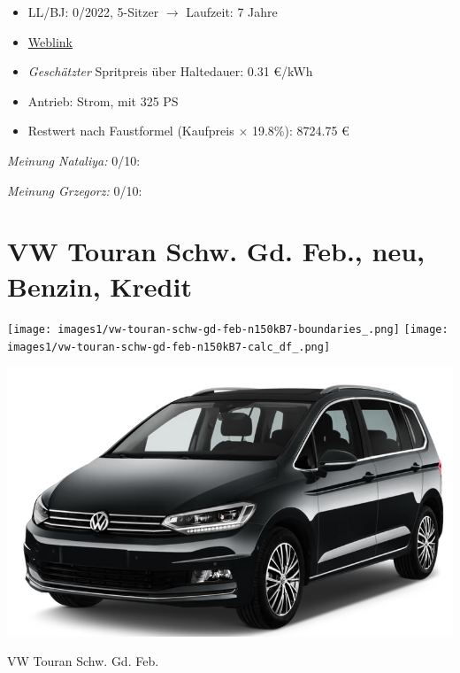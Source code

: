 \documentclass[landscape, DIV=99, 14pt]{scrartcl}
\begin{document}
\begin{itemize}
    \item LL/BJ: 0/2022, 5-Sitzer $\rightarrow$ Laufzeit: 7 Jahre
    \item \href{https://www.tesla.com/de_de/model3/design\#overview}{Weblink}
    \item \emph{Gesch\"atzter} Spritpreis \"uber Haltedauer: 0.31 \euro{}/kWh
    \item Antrieb: Strom, mit 325 PS
    \item Restwert nach Faustformel (Kaufpreis $\times$ 19.8\%): 8724.75 \euro{}
\end{itemize}

\begin{small}
\emph{Meinung Nataliya:} 0/10: 
        
\emph{Meinung Grzegorz:} 0/10: 
\end{small}

\pagebreak


\twocolumn

\section*{VW Touran Schw. Gd. Feb., neu, Benzin, Kredit}
\begin{center}
\texttt{[image: images1/vw-touran-schw-gd-feb-n150kB7-boundaries\_.png]}
\null
\vspace{0.5cm}
\texttt{[image: images1/vw-touran-schw-gd-feb-n150kB7-calc\_df\_.png]}
\end{center}

\pagebreak
\begin{center}
\includegraphics[width=0.9\columnwidth]{cars/vw-touran.png}

VW Touran Schw. Gd. Feb.
\end{center}
\end{document}
